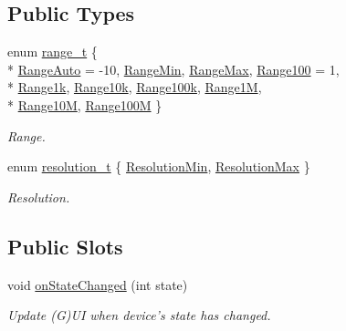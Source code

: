 \subsection*{Public Types}
\begin{DoxyCompactItemize}
\item 
enum \hyperlink{classmdt_device_u3606_a_ae05c254d19a66c1728d30100f7c600dc}{range\-\_\-t} \{ \\*
\hyperlink{classmdt_device_u3606_a_ae05c254d19a66c1728d30100f7c600dcaad020d13863dbfcb395ce08330d5724e}{Range\-Auto} = -\/10, 
\hyperlink{classmdt_device_u3606_a_ae05c254d19a66c1728d30100f7c600dca7a11a8189a61ead1b631c06488bb8a06}{Range\-Min}, 
\hyperlink{classmdt_device_u3606_a_ae05c254d19a66c1728d30100f7c600dcaea44e09b32e699856e6dd58c0a222344}{Range\-Max}, 
\hyperlink{classmdt_device_u3606_a_ae05c254d19a66c1728d30100f7c600dca724e28864e513d31ac8a9c3525a0a5aa}{Range100} = 1, 
\\*
\hyperlink{classmdt_device_u3606_a_ae05c254d19a66c1728d30100f7c600dca7c08dab5ef9ed34a00304f8aa0b8f17f}{Range1k}, 
\hyperlink{classmdt_device_u3606_a_ae05c254d19a66c1728d30100f7c600dca50d29071b501dc633b5a12fac4f23a53}{Range10k}, 
\hyperlink{classmdt_device_u3606_a_ae05c254d19a66c1728d30100f7c600dca4baa02141d972c77f493a53691bae435}{Range100k}, 
\hyperlink{classmdt_device_u3606_a_ae05c254d19a66c1728d30100f7c600dcacd7e52976fffc3eb6def4efb5303d082}{Range1\-M}, 
\\*
\hyperlink{classmdt_device_u3606_a_ae05c254d19a66c1728d30100f7c600dcadf4218b4809f09c734ee289fbfc06108}{Range10\-M}, 
\hyperlink{classmdt_device_u3606_a_ae05c254d19a66c1728d30100f7c600dca20e91ee2eeb1a64e2353586c8c8b3cea}{Range100\-M}
 \}
\begin{DoxyCompactList}\small\item\em Range. \end{DoxyCompactList}\item 
enum \hyperlink{classmdt_device_u3606_a_a1899206163f2a0163d09cbc482daf806}{resolution\-\_\-t} \{ \hyperlink{classmdt_device_u3606_a_a1899206163f2a0163d09cbc482daf806a49419daba75cbb553401b066a3c2e6da}{Resolution\-Min}, 
\hyperlink{classmdt_device_u3606_a_a1899206163f2a0163d09cbc482daf806a82c71d88404eb70e505cbce753aaf06f}{Resolution\-Max}
 \}
\begin{DoxyCompactList}\small\item\em Resolution. \end{DoxyCompactList}\end{DoxyCompactItemize}
\subsection*{Public Slots}
\begin{DoxyCompactItemize}
\item 
void \hyperlink{classmdt_device_u3606_a_a94a6f8b3f64cd35b33204c66816f3f6a}{on\-State\-Changed} (int state)
\begin{DoxyCompactList}\small\item\em Update (G)U\-I when device's state has changed. \end{DoxyCompactList}\end{DoxyCompactItemize}
